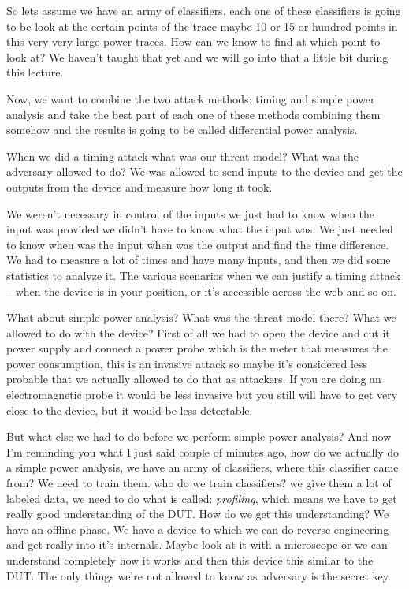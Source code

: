  So lets assume we have an army of classifiers, each one of these classifiers is going to be look at the certain points of the trace maybe 10 or 15 or hundred points in this very very large power traces. How can we know to find at which point to look at? We haven't taught that yet and we will go into that a little bit during this lecture. 
 
 Now, we want to combine the two attack methods: timing and simple power analysis and take the best part of each one of these methods combining them somehow and the results is going to be called differential power analysis.
 
 When we did a timing attack what was our threat model? What was the adversary allowed to do?
 We was allowed to send inputs to the device and get the outputs from the device and measure how long it took.
 
 We weren’t necessary in control of the inputs we just had to know when the input was provided we didn’t have to know what the input was. We just needed to know when was the input when was the output and find the time difference. We had to measure a lot of times and have many inputs, and then we did some statistics to analyze it.
  The various scenarios when we can justify a timing attack – when the device is in your position, or it's accessible across the web and so on.
  
  What about simple power analysis? What was the threat model there? What we allowed to do with the device?
  First of all we had to open the device and cut it power supply and connect a power probe which is the meter that measures the power consumption, this is an invasive attack so maybe it’s considered less probable that we actually allowed to do that as attackers. If you are doing an electromagnetic probe it would be less invasive but you still will have to get very close to the device, but it would be less detectable. 
  
  But what else we had to do before we perform simple power analysis? And now I’m reminding you what I just said couple of minutes ago, how do we actually do a simple power analysis, we have an army of classifiers, where this classifier came from? We need to train them. who do we train classifiers? we give them a lot of labeled data, we need to do what is called: \textit{profiling}, which means we have to get really good understanding of the DUT.
  How do we get this understanding? We have an offline phase.
  We have a device to which we can do reverse engineering and get really into it's internals. Maybe look at it with a microscope or we can understand completely how it works and then this device this similar to the DUT. The only things we're not allowed to know as adversary is the secret key.
  
